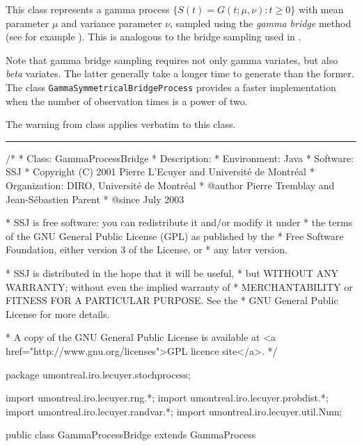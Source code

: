 
This class represents a gamma process
$\{ S(t) = G(t; \mu, \nu) : t \geq 0 \}$ with mean parameter $\mu$ and
variance parameter $\nu$, sampled using the \emph{gamma bridge} method
(see for example \cite{fRIB02a,fAVR03a}).
This is analogous to the bridge sampling used in
.

Note that gamma bridge sampling requires not only gamma variates, but also
\emph{beta} variates. The latter generally take a longer time to generate
than the former. The class \texttt{GammaSymmetricalBridgeProcess} provides
a faster implementation when the number of observation times
is a power of two.

The warning from class  applies verbatim
to this class.

\bigskip\hrule\bigskip

\begin{code}
\begin{hide}
/*
 * Class:        GammaProcessBridge
 * Description:  
 * Environment:  Java
 * Software:     SSJ 
 * Copyright (C) 2001  Pierre L'Ecuyer and Université de Montréal
 * Organization: DIRO, Université de Montréal
 * @author       Pierre Tremblay and Jean-Sébastien Parent
 * @since        July 2003

 * SSJ is free software: you can redistribute it and/or modify it under
 * the terms of the GNU General Public License (GPL) as published by the
 * Free Software Foundation, either version 3 of the License, or
 * any later version.

 * SSJ is distributed in the hope that it will be useful,
 * but WITHOUT ANY WARRANTY; without even the implied warranty of
 * MERCHANTABILITY or FITNESS FOR A PARTICULAR PURPOSE.  See the
 * GNU General Public License for more details.

 * A copy of the GNU General Public License is available at
   <a href="http://www.gnu.org/licenses">GPL licence site</a>.
 */
\end{hide}
package umontreal.iro.lecuyer.stochprocess;\begin{hide}
import umontreal.iro.lecuyer.rng.*;
import umontreal.iro.lecuyer.probdist.*;
import umontreal.iro.lecuyer.randvar.*;
import umontreal.iro.lecuyer.util.Num;
\end{hide}

public class GammaProcessBridge extends GammaProcess \begin{hide} {
    protected BetaGen      Bgen;
    protected double       mu2OverNu,
                           mu2dTOverNu;
    protected double[]     bMu2dtOverNuL,  // For precomputations for G Bridge
                           bMu2dtOverNuR;
    protected int[]        wIndexList;
    protected int          bridgeCounter = -1; // Before 1st observ
\end{hide}
\end{code}
